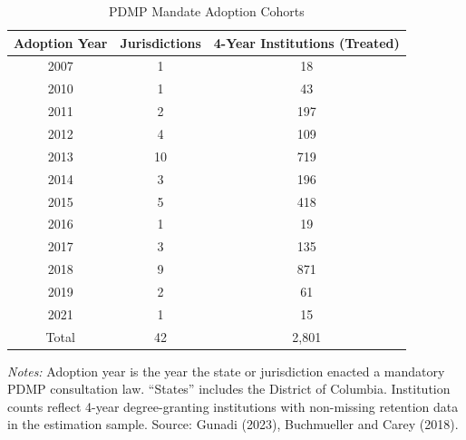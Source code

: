 \begin{table}[htbp]
\centering
\caption{PDMP Mandate Adoption Cohorts}
\label{tab:cohorts}
\begin{threeparttable}
\begin{tabular}{ccc}
\toprule
Adoption Year & Jurisdictions & 4-Year Institutions (Treated) \\
\midrule
2007 & 1 & 18 \\
2010 & 1 & 43 \\
2011 & 2 & 197 \\
2012 & 4 & 109 \\
2013 & 10 & 719 \\
2014 & 3 & 196 \\
2015 & 5 & 418 \\
2016 & 1 & 19 \\
2017 & 3 & 135 \\
2018 & 9 & 871 \\
2019 & 2 & 61 \\
2021 & 1 & 15 \\
\midrule
Total & 42 & 2,801 \\
\bottomrule
\end{tabular}
\begin{tablenotes}
\small
\item \textit{Notes:} Adoption year is the year the state or jurisdiction enacted a mandatory PDMP consultation law. ``States'' includes the District of Columbia. Institution counts reflect 4-year degree-granting institutions with non-missing retention data in the estimation sample. Source: Gunadi (2023), Buchmueller and Carey (2018).
\end{tablenotes}
\end{threeparttable}
\end{table}
